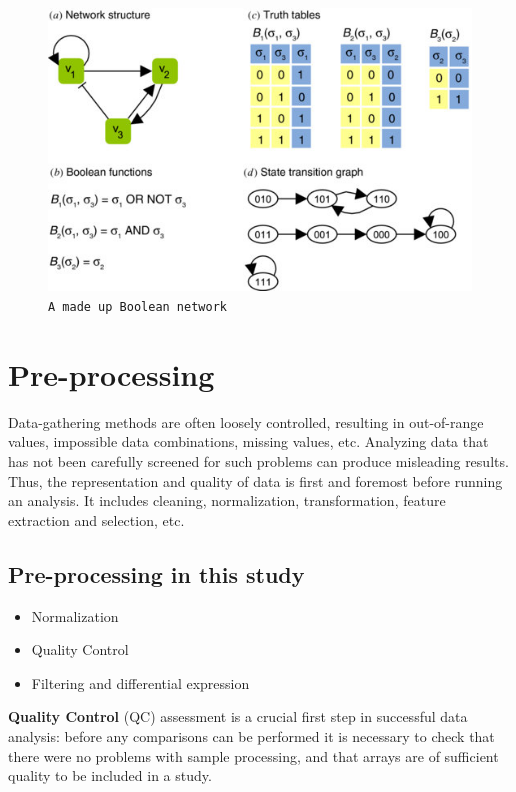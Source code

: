 \documentclass[oneside, a4paper, 11pt]{book}
\begin{document}
\begin{figure}[h]
    \centering
    \includegraphics[width=\textwidth]{BN2.jpg}
    \caption {\texttt{A made up Boolean network}}
    \label{bayes}
\end{figure}

\section{Pre-processing} \label{preprocess}
Data-gathering methods are often loosely controlled, resulting in out-of-range values, impossible data combinations, missing values, etc. Analyzing data that has not been carefully screened for such problems can produce misleading results. Thus, the representation and quality of data is first and foremost before running an analysis. It includes cleaning, normalization, transformation, feature extraction and selection, etc.

\subsection{Pre-processing in this study}
\begin{itemize}
  \item Normalization
  \item Quality Control
  \item Filtering and differential expression
\end{itemize}

\textbf{Quality Control} (QC) assessment is a crucial first step in successful data analysis: before any comparisons can be performed it is necessary to check that there were no problems with sample processing, and that arrays are of sufficient quality to be included in a study.
\newline
\end{document}

